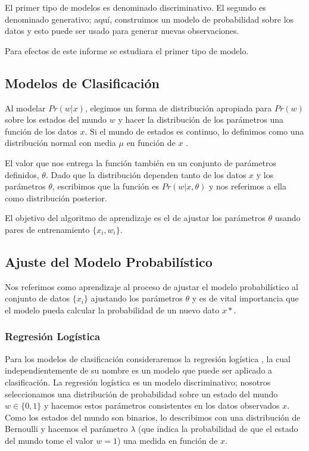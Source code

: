 \documentclass[letter,12pt]{report}
\begin{document}
El primer tipo de modelos es denominado discriminativo. El segundo es denominado
generativo; aquí, construimos un modelo de probabilidad sobre los datos y esto puede ser
usado para generar nuevas observaciones.

Para efectos de este informe se estudiara el primer tipo de modelo.

\subsection{Modelos de Clasificación}
Al modelar $Pr(w|x)$, elegimos un forma de distribución apropiada para $Pr(w)$ sobre los
estados del mundo $w$ y hacer la distribución de los parámetros una función de los datos
$x$. Si el mundo de estados es continuo, lo definimos como una distribución normal con
media $\mu$ en función de $x$ \cite{MLClass}.

El valor que nos entrega la función también en un conjunto de parámetros definidos,
$\theta$. Dado que la distribución dependen tanto de los datos $x$ y los parámetros
$\theta$, escribimos que la función es $Pr(w|x, \theta)$ y nos referimos a ella como
distribución posterior.

El objetivo del algoritmo de aprendizaje es el de ajustar los parámetros $\theta$ usando
pares de entrenamiento $\{x_i, w_i\}$.

\subsection{Ajuste del Modelo Probabilístico}
Nos referimos como aprendizaje al proceso de ajustar el modelo probabilístico al conjunto
de datos $\{x_i\}$ ajustando los parámetros $\theta$ y es de vital importancia que el
modelo pueda calcular la probabilidad de un nuevo dato $x*$\cite{Probab}.

\subsubsection{Regresión Logística}
Para los modelos de clasificación consideraremos la regresión logística \cite{LogicR}, la cual
independientemente de su nombre es un modelo que puede ser aplicado a clasificación. La
regresión logística es un modelo  discriminativo; nosotros seleccionamos una distribución
de probabilidad sobre un estado del mundo $w \in \{0, 1\}$ y hacemos estos parámetros
consistentes en los datos observados $x$. Como los estados del mundo son binarios,
lo describimos con una distribución de Bernoulli y hacemos el parámetro $\lambda$ (que
indica la probabilidad de que el estado del mundo tome el valor $w=1$) una medida en
función de $x$.
\end{document}
